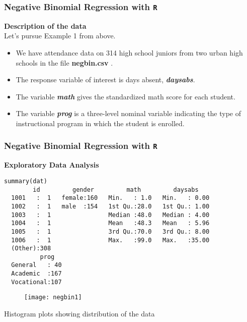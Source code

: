 \documentclass[MASTER.tex]{subfiles}
\begin{document}
\begin{frame}[fragile]
\frametitle{Negative Binomial Regression with \texttt{R} }
\Large
\textbf{Description of the data}\\
Let's pursue Example 1 from above.
\begin{itemize}
\item We have attendance data on 314 high school juniors from two urban high schools in the file \textbf{negbin.csv }. 
\item The response variable of interest is days absent, \textbf{\textit{daysabs}}. 
\item The variable \textbf{\textit{math}} gives the standardized math score for each student. 
\item The variable \textbf{\textit{prog}} is a three-level nominal variable indicating the type of instructional program in which the student is enrolled.
\end{itemize}
\end{frame}
\begin{frame}[fragile]
\frametitle{Negative Binomial Regression with \texttt{R} }
\noindent \textbf{Exploratory Data Analysis}
\begin{verbatim}	
summary(dat)
        id         gender         math         daysabs     
  1001   :  1   female:160   Min.   : 1.0   Min.   : 0.00  
  1002   :  1   male  :154   1st Qu.:28.0   1st Qu.: 1.00  
  1003   :  1                Median :48.0   Median : 4.00  
  1004   :  1                Mean   :48.3   Mean   : 5.96  
  1005   :  1                3rd Qu.:70.0   3rd Qu.: 8.00  
  1006   :  1                Max.   :99.0   Max.   :35.00  
  (Other):308                                              
          prog    
  General   : 40  
  Academic  :167  
  Vocational:107  
\end{verbatim}	
\end{frame}
\begin{frame}
\begin{figure}
\centering
\texttt{[image: negbin1]}
\end{figure}
Histogram plots showing distribution of the data
\end{frame}
%
%
%
\end{document}
